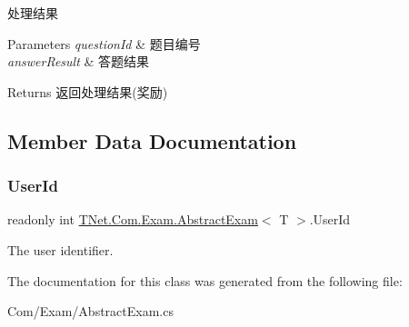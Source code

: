 处理结果 


\begin{DoxyParams}{Parameters}
{\em question\+Id} & 题目编号\\
\hline
{\em answer\+Result} & 答题结果\\
\hline
\end{DoxyParams}
\begin{DoxyReturn}{Returns}
返回处理结果(奖励)
\end{DoxyReturn}


\subsection{Member Data Documentation}
\mbox{\label{class_t_net_1_1_com_1_1_exam_1_1_abstract_exam_a6da2ee3a695db3248702ca932298e70a}} 
\subsubsection{\texorpdfstring{User\+Id}{UserId}}
{\footnotesize\ttfamily readonly int \mbox{\hyperlink{class_t_net_1_1_com_1_1_exam_1_1_abstract_exam}{T\+Net.\+Com.\+Exam.\+Abstract\+Exam}}$<$ T $>$.User\+Id\hspace{0.3cm}{\ttfamily [protected]}}



The user identifier. 



The documentation for this class was generated from the following file\+:\begin{DoxyCompactItemize}
\item 
Com/\+Exam/Abstract\+Exam.\+cs\end{DoxyCompactItemize}
